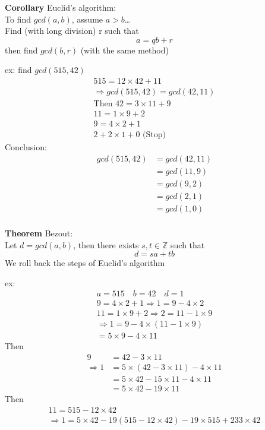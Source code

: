 \documentclass{article}
\begin{document}
\textbf{Corollary} Euclid's algorithm:\\
To find $gcd(a,b)$, assume $a>b$\dots \\ Find (with long division) r such that
\[
    a = qb+r
\] then find $gcd(b,r)$ (with the same method)

ex: find $gcd(515,42)$
\begin{gather*}
    515 = 12 \times 42 + 11 \\
    \Rightarrow gcd(515, 42) = gcd(42,11)\\
    \text{Then } 42 = 3 \times 11 + 9 \\
    11 = 1 \times 9 + 2 \\
    9 = 4 \times 2 + 1\\
    2 + 2 \times 1 + \boxed{0} \text{ (Stop)}
\end{gather*}
Conclusion: \begin{align*}
    gcd (515,42)
     & = gcd(42,11)        \\
     & = gcd(11,9)         \\
     & = gcd(9,2)          \\
     & = gcd(2,1)          \\
     & = gcd(\boxed{1} ,0) \\
\end{align*}

\textbf{Theorem} Bezout: \\
Let $d = gcd(a,b)$, then there exists $s,t \in \mathbb{Z} $ such that
\[
    \boxed{ d = sa + tb}
\]
We roll back the steps of Euclid's algorithm

ex: \begin{gather*}
    a = 515 \quad b = 42 \quad d = 1\\
    9 = 4 \times 2 + \boxed{1} \Rightarrow 1=9-4 \times 2 \\
    11 = 1 \times 9 + \boxed{2} \Rightarrow  2=11-1 \times 9 \\
    \Rightarrow 1 = 9-4 \times (11 -1 \times 9)\\
    = 5 \times 9 - 4 \times 11
\end{gather*}
Then
\begin{align*}
    9 & = 42 - 3 \times 11                         \\
    \Rightarrow 1
      & = 5 \times (42-3 \times 11) - 4 \times 11  \\
      & = 5 \times 42 - 15 \times 11 - 4 \times 11 \\
      & = 5 \times 42 - 19 \times 11
\end{align*}
Then
\begin{gather*}
    11 = 515 - 12 \times 42 \\
    \Rightarrow 1
    = 5 \times 42 - 19(515-12 \times 42) - 19 \times 515 + 233 \times 42
\end{gather*}
\end{document}
